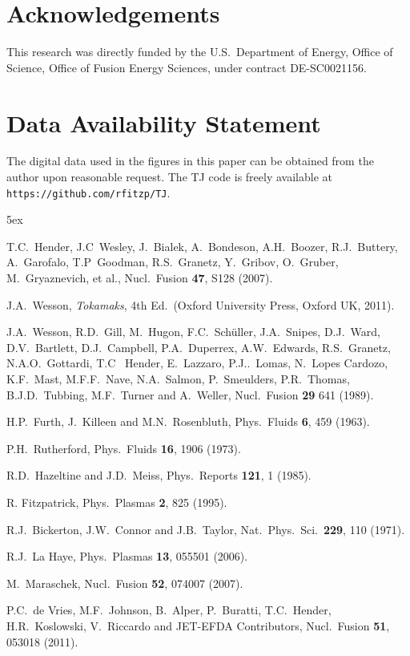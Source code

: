 \documentclass[12pt,prb,aps]{revtex4-1}
\begin{document}
\section*{Acknowledgements}
This research was directly funded by the U.S.\ Department of Energy, Office of Science, Office of Fusion Energy Sciences, under  contract DE-SC0021156. 

\section*{Data Availability Statement}
The digital data used in the figures in this paper can be obtained from the author upon reasonable request. The TJ code is freely 
available at {\tt https://github.com/rfitzp/TJ}. 

\begin{thebibliography}{99}\baselineskip 5ex

 T.C.~Hender, J.C~Wesley, J.~Bialek, A.~Bondeson, A.H.~Boozer, R.J.~Buttery, A.~Garofalo, T.P~Goodman, R.S.~Granetz, Y.~Gribov, O.~Gruber, 
M.~Gryaznevich, et al., Nucl.\  Fusion {\bf 47}, S128 (2007).

 J.A.~Wesson, {\em Tokamaks}, 4th Ed.\ (Oxford University Press, Oxford UK, 2011).

 J.A.~Wesson, R.D.~Gill, M.~Hugon, F.C.~Sch\"{u}ller, J.A.~Snipes, D.J.~Ward, D.V.~Bartlett, D.J.~Campbell, P.A.~Duperrex, A.W.~Edwards, 
R.S.~Granetz, N.A.O.~Gottardi, T.C~ Hender, E.~Lazzaro, P.J..~Lomas, N.~Lopes Cardozo, K.F.~Mast, M.F.F.~Nave, N.A.~Salmon, P.~Smeulders, 
P.R.~Thomas, B.J.D.~Tubbing, M.F.~Turner and A.~Weller, Nucl.\ Fusion {\bf 29} 641 (1989). 

 H.P.~Furth,  J.~Killeen and M.N.~Rosenbluth,  Phys.\ Fluids {\bf 6}, 459 (1963).

 P.H.~Rutherford, Phys.\ Fluids {\bf 16}, 1906 (1973).

 R.D.~Hazeltine and J.D.~Meiss, Phys.\ Reports {\bf 121}, 1 (1985).

 R. Fitzpatrick, Phys.\ Plasmas {\bf 2}, 825 (1995).

 R.J.~Bickerton, J.W.~Connor and J.B.~Taylor, Nat.\ Phys.\ Sci.\ {\bf 229}, 110 (1971). 

 R.J.~La Haye, Phys.\ Plasmas {\bf 13}, 055501 (2006).

 M.~Maraschek, Nucl.\ Fusion {\bf 52}, 074007 (2007). 

 P.C.~de Vries, M.F.~Johnson, B.~Alper, P.~Buratti, T.C.~Hender, H.R.~Koslowski, V.~Riccardo and JET-EFDA Contributors,  Nucl.\ Fusion {\bf 51},  053018 (2011).


\end{thebibliography}
\end{document}
